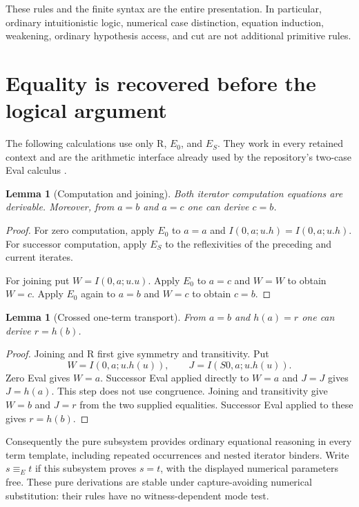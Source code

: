 \documentclass[11pt]{article}
\newtheorem{lemma}[theorem]{Lemma}
\theoremstyle{definition}
\theoremstyle{remark}
\newcommand{\EqE}{\mathrel{\equiv_E}}
\begin{document}
These rules and the finite syntax are the entire presentation. In
particular, ordinary intuitionistic logic, numerical case distinction,
equation induction, weakening, ordinary hypothesis access, and cut are
not additional primitive rules.

\section{Equality is recovered before the logical argument}
\label{sec:equality}

The following calculations use only R, $E_0$, and $E_S$. They work in
every retained context and are the arithmetic interface already used by
the repository's two-case Eval calculus \cite{eval}.

\begin{lemma}[Computation and joining]
Both iterator computation equations are derivable. Moreover, from
$a=b$ and $a=c$ one can derive $c=b$.
\end{lemma}
\begin{proof}
For zero computation, apply $E_0$ to $a=a$ and
$I(0,a;u.h)=I(0,a;u.h)$. For successor computation, apply $E_S$ to the
reflexivities of the preceding and current iterates.

For joining put $W=I(0,a;u.u)$. Apply $E_0$ to $a=c$ and $W=W$ to obtain
$W=c$. Apply $E_0$ again to $a=b$ and $W=c$ to obtain $c=b$.
\end{proof}

\begin{lemma}[Crossed one-term transport]
From $a=b$ and $h(a)=r$ one can derive $r=h(b)$.
\end{lemma}
\begin{proof}
Joining and R first give symmetry and transitivity. Put
\[
 W=I(0,a;u.h(u)),\qquad J=I(S0,a;u.h(u)).
\]
Zero Eval gives $W=a$. Successor Eval applied directly to $W=a$ and
$J=J$ gives $J=h(a)$. This step does not use congruence. Joining and
transitivity give $W=b$ and $J=r$ from the two supplied equalities.
Successor Eval applied to these gives $r=h(b)$.
\end{proof}

Consequently the pure subsystem provides ordinary equational reasoning
in every term template, including repeated occurrences and nested
iterator binders. Write $s\EqE t$ if this subsystem proves $s=t$, with
the displayed numerical parameters free. These pure derivations are
stable under capture-avoiding numerical substitution: their rules have
no witness-dependent mode test.
\end{document}
